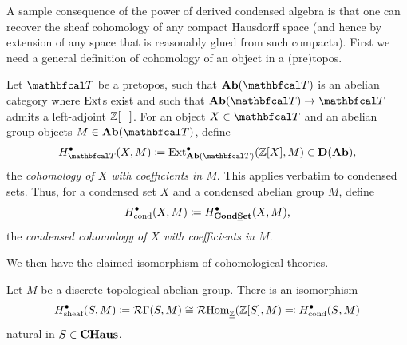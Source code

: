 A sample consequence of the power of derived condensed algebra is that one can recover the sheaf cohomology of any compact Hausdorff space (and hence by extension of any space that is reasonably glued from such compacta). First we need a general definition of cohomology of an object in a (pre)topos.
\begin{definition}
	Let $\category T$ be a pretopos, such that $\Ab(\category T)$ is an abelian category where ${\operatorname{Ext}}$s exist and such that $\Ab(\category T)\to \category T$ admits a left-adjoint ${\mathbb{Z}}[-]$. For an object $X\in\category T$ and an abelian group objects $M\in\Ab(\category T)$, define
	$$H_\category T^\bullet(X, M) \ldef \Ext^\bullet_{\Ab(\category T)}(\Z[X], M) \in \derived{\Ab},$$
	the \emph{cohomology of $X$ with coefficients in $M$}. This applies verbatim to condensed sets. Thus, for a condensed set $X$ and a condensed abelian group $M$, define
	$$H_\text{cond}^\bullet(X, M)\coloneqq H_{{{\mathbf{Cond}}}{{\mathbf{\underline{S}et}}}}^\bullet(X, M),$$
	the \emph{condensed cohomology of $X$ with coefficients in $M$}.
\end{definition}

We then have the claimed isomorphism of cohomological theories.
\begin{theorem}
	Let $M$ be a discrete topological abelian group. There is an isomorphism
	$$H_\text{sheaf}^\bullet(S, \underline{M}) \coloneqq \mathcal{R}\Gamma(S, \underline{M})\cong \mathcal{R}{\underline{\operatorname{Hom}}}_{\underline{{\mathbb{Z}}}}({{\underline{{\mathbb{Z}}}[\underline{S}]}}, \underline{M}) \eqqcolon H_\text{cond}^\bullet(\underline{S}, \underline{M})$$
	natural in $S\in{{\mathbf{CHaus}}}$. 
\end{theorem}

